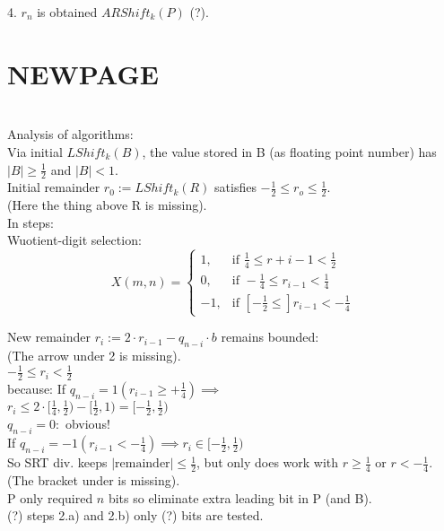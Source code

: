 4. $r_n$ is obtained $ARShift_k(P)$ (?). \bigskip

\section*{NEWPAGE} \\
Analysis of algorithms: \\
Via initial $LShift_k(B)$, the value stored in B (as floating point number) has $|B|\ge \frac{1}{2}$ and $|B|<1$. \\

Initial remainder $r_0:=LShift_k(R)$ satisfies $-\frac{1}{2}\le r_o\le \frac{1}{2}$. \\
(Here the thing above R is missing). \\

In steps: \\
Wuotient-digit selection:
$$
X(m,n)=
\begin{cases}
1, & \text{if } \frac{1}{4}\le r+{i-1}<\frac{1}{2}\\
0, & \text{if } -\frac{1}{4}\le r_{i-1}<\frac{1}{4}\\
-1, & \text{if } [-\frac{1}{2}\le] r_{i-1}<-\frac{1}{4}
\end{cases}
$$

New remainder $r_i:=2\cdot r_{i-1}-q_{n-i}\cdot b$ remains bounded: \\
(The arrow under 2 is missing). \\

$-\frac{1}{2}\le r_i< \frac{1}{2}$ \\
because: If $q_{n-i}=1(r_{i-1}\ge+\frac{1}{4})\implies$ \\
$r_i\le 2\cdot [\frac{1}{4},\frac{1}{2})-[\frac{1}{2},1)=[-\frac{1}{2},\frac{1}{2})$ \\
$q_{n-i}=0:$ obvious! \\
If $q_{n-i}=-1(r_{i-1}<-\frac{1}{4})\implies r_i\in[-\frac{1}{2},\frac{1}{2})$ \\

So SRT div. keeps $|\text{remainder}|\le \frac{1}{2}$, but only does work with $r\ge \frac{1}{4}$ or $r<-\frac{1}{4}$. \\
(The bracket under is missing). \\

\implies P only required $n$ bits so eliminate extra leading bit in P (and B). \\
(?) steps 2.a) and 2.b) only (?) bits are tested. \\


